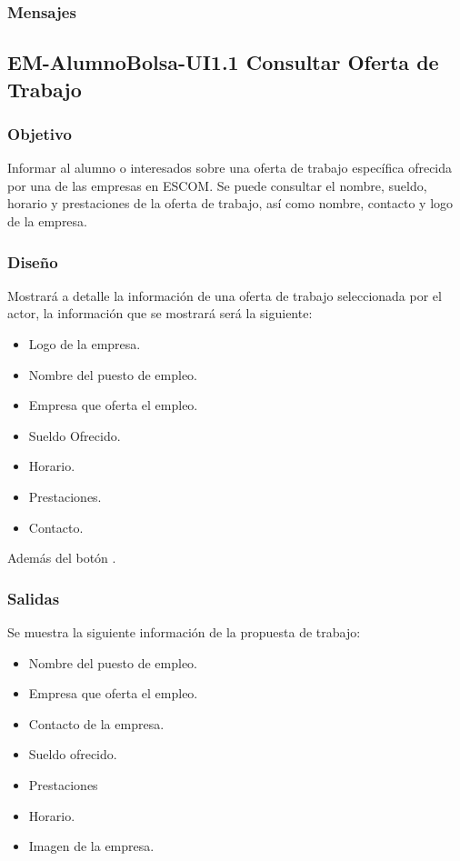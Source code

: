 \subsubsection{Mensajes}
	\noindent




\pagebreak
\subsection{EM-AlumnoBolsa-UI1.1 Consultar Oferta de Trabajo}

\subsubsection{Objetivo}
	\noindent
	Informar al alumno o interesados sobre una oferta de trabajo específica ofrecida por una de las empresas en ESCOM. Se puede consultar el nombre, sueldo, horario y prestaciones de la oferta de trabajo, así como nombre, contacto y logo de la empresa.

\subsubsection{Diseño}
	\noindent
	Mostrará a detalle la información de una oferta de trabajo seleccionada por el actor, la información que se mostrará será la siguiente:
	\begin{itemize}
			\item Logo de la empresa.
			\item Nombre del puesto de empleo.
			\item Empresa que oferta el empleo.
			\item Sueldo Ofrecido.
			\item Horario.
			\item Prestaciones.
			\item Contacto.
	\end{itemize}
	Además del botón .

\pagebreak
{}

\subsubsection{Salidas}
	Se muestra la siguiente información de la propuesta de trabajo:
	\begin{itemize}
		\item Nombre del puesto de empleo.
		\item Empresa que oferta el empleo.
		\item Contacto de la empresa.
		\item Sueldo ofrecido.
		\item Prestaciones
		\item Horario.
		\item Imagen de la empresa.
	\end{itemize}

